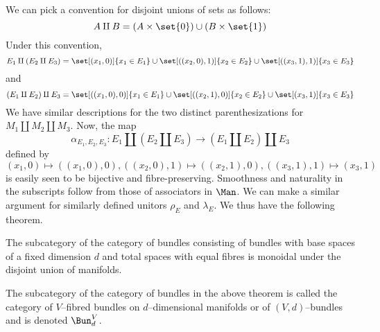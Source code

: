 \documentclass[\PRJWD/Thick_TQFTs_and_Quantum_Information.tex]{subfiles}
\begin{document}
We can pick a convention for disjoint unions of sets as follows:
\[
  A \amalg B = (A \times \set{0}) \cup (B \times \set{1})
\]
Under this convention,
\[
  E_1 \amalg (E_2 \amalg E_3)
    = \set[(x_1, 0)]{x_1 \in E_1}
      \cup \set[((x_2, 0), 1)]{x_2 \in E_2}
      \cup \set[((x_3, 1), 1)]{x_3 \in E_3}
\]
and
\[
  (E_1 \amalg E_2) \amalg E_3
    = \set[((x_1, 0), 0)]{x_1 \in E_1}
      \cup \set[((x_2, 1), 0)]{x_2 \in E_2}
      \cup \set[(x_3, 1)]{x_3 \in E_3}
\]
We have similar descriptions for the two distinct parenthesizations for
$M_1 \amalg M_2 \amalg M_3$. Now, the map
\[
  \alpha_{E_1, E_2, E_3} : E_1 \amalg (E_2 \amalg E_3)
                           \to (E_1 \amalg E_2) \amalg E_3
\]
defined by
\[
  (x_1, 0) \mapsto ((x_1, 0), 0),
  ((x_2, 0), 1) \mapsto ((x_2, 1), 0),
  ((x_3, 1), 1) \mapsto (x_3, 1)
\]
is easily seen to be bijective and fibre-preserving. Smoothness and naturality
in the subscripts follow from those of associators in $\Man$. We can make a
similar argument for similarly defined unitors $\rho_E$ and $\lambda_E$. We thus
have the following theorem.
\begin{thm}
The subcategory of the category of bundles consisting of bundles with base
spaces of a fixed dimension $d$ and total spaces with equal fibres is monoidal
under the disjoint union of manifolds.
\end{thm}
\begin{defn}
The subcategory of the category of bundles in the above theorem is called the
category of $V$--fibred bundles on $d$--dimensional manifolds or of
$(V, d)$--bundles and is denoted $\Bun^V_d$.
\end{defn}
\end{document}
